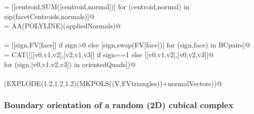 \documentclass[11pt,oneside]{article}	%
\begin{document}
\begin{flushleft}
\begin{list}{}{}
\mbox{}\verb@appliedNormals = [[centroid,SUM([centroid,normal])] for (centroid,normal) in zip(facetCentroids,normals)]@\\
\mbox{}\verb@normalVectors = AA(POLYLINE)(appliedNormals)@\\
\mbox{}\verb@@\\
\mbox{}\verb@orientedQuads = [[sign,FV[face]] if sign>0 else [sign,swap(FV[face])] for (sign,face) in BCpairs]@\\
\mbox{}\verb@FVtriangles = CAT([[[v0,v1,v2],[v2,v1,v3]] if sign==1 else [[v0,v1,v2],[v0,v2,v3]]@\\
\mbox{}\verb@            for (sign,[v0,v1,v2,v3]) in orientedQuads])@\\
\mbox{}\verb@@\\
\mbox{}\verb@VIEW(EXPLODE(1.2,1.2,1.2)(MKPOLS((V,FVtriangles))+normalVectors))@\\
\mbox{}\verb@@{\NWsep}
\end{list}
\vspace{-2ex}
\end{flushleft}





\subsubsection{Boundary orientation of a random (2D) cubical complex}
\end{document}
